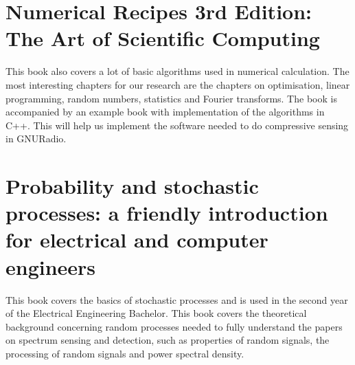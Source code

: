 \documentclass[report, oneside, a4paper, openany]{memoir}
\begin{document}
\section{Numerical Recipes 3rd Edition: The Art of Scientific Computing \cite{press2007numerical}}
This book also covers a lot of basic algorithms used in numerical calculation. The most interesting chapters for our research are the chapters on optimisation, linear programming, random numbers, statistics and Fourier transforms.  The book is accompanied by an example book with implementation of the algorithms in C++. This will help us implement the software needed to do compressive sensing in GNURadio.
\section{Probability and stochastic processes: a friendly introduction for electrical and computer engineers \cite{yates2005probability}}
This book covers the basics of stochastic processes and is used in the second year of the Electrical Engineering Bachelor. This book covers the theoretical background concerning random processes needed to fully understand the papers on spectrum sensing and detection, such as properties of random signals, the processing of random signals and power spectral density.
\end{document}
